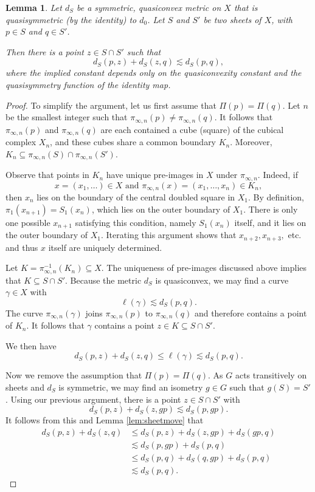 \documentclass{amsart}
\theoremstyle{plain}
\newtheorem{lemma}[theorem]{Lemma}
\theoremstyle{definition}
\numberwithin{equation}{section}
\numberwithin{theorem}{section}
\begin{document}
\begin{lemma}\label{lem:twosheets}
Let $d_{S}$ be a symmetric, quasiconvex metric on $X$ that is quasisymmetric (by the identity) to $d_0$. Let $S$ and $S'$ be two sheets of $X$, with $p\in S$ and $q\in S'$.

Then there is a point $z\in S\cap S'$ such that
$$ d_{S}(p,z) + d_{S}(z,q) \lesssim d_{S}(p,q),$$
where the implied constant depends only on the quasiconvexity constant and the quasisymmetry function of the identity map.
\end{lemma}
\begin{proof}
To simplify the argument, let us first assume that $\Pi(p) = \Pi(q)$. Let $n$ be the smallest integer such that $\pi_{\infty,n}(p)\neq \pi_{\infty,n}(q)$. It follows that $\pi_{\infty,n}(p)$ and $\pi_{\infty,n}(q)$ are each contained a cube (square) of the cubical complex $X_n$, and these cubes share a common boundary $K_n$. Moreover, $K_n\subseteq \pi_{\infty,n}(S) \cap \pi_{\infty,n}(S')$.

Observe that points in $K_n$ have unique pre-images in $X$ under $\pi_{\infty,n}$. Indeed, if
$$x=(x_1,\dots)\in X \text{ and } \pi_{\infty,n}(x)= (x_1, \dots, x_n) \in K_n,$$
then $x_n$ lies on the boundary of the central doubled square in $X_1$. By definition, $\pi_1(x_{n+1})=S_1(x_n)$, which lies on the outer boundary of $X_1$. There is only one possible $x_{n+1}$ satisfying this condition, namely $S_1(x_n)$ itself, and it lies on the outer boundary of $X_1$. Iterating this argument shows that $x_{n+2}, x_{n+3}, $ etc. and thus $x$ itself are uniquely determined.

Let $K=\pi_{\infty,n}^{-1}(K_n)\subseteq X$. The uniqueness of pre-images discussed above implies that $K\subseteq S\cap S'$. Because the metric $d_S$ is quasiconvex, we may find a curve $\gamma\in X$ with
$$ \ell(\gamma) \lesssim d_S(p,q).$$
The curve $\pi_{\infty,n}(\gamma)$ joins $\pi_{\infty,n}(p)$ to $\pi_{\infty,n}(q)$ and therefore contains a point of $K_n$. It follows that $\gamma$ contains a point $z\in K\subseteq S\cap S'$.

We then have
$$ d_S(p,z) + d_S(z,q) \leq \ell(\gamma) \lesssim d_S(p,q).$$

Now we remove the assumption that $\Pi(p)=\Pi(q)$. As $G$ acts transitively on sheets and $d_S$ is symmetric, we may find an isometry $g\in G$ such that $g(S)=S'$. Using our previous argument, there is a point $z\in S\cap S'$ with
$$ d_S(p,z) + d_S(z,gp) \lesssim d_S(p,gp).$$
It follows from this and Lemma \ref{lem:sheetmove} that
\begin{align*}
d_S(p,z)+d_S(z,q) &\leq d_S(p,z)+d_S(z,gp)+d_S(gp,q)\\ 
&\lesssim d_S(p,gp) + d_S(p,q)\\
&\leq d_S(p,q)+d_S(q,gp) + d_S(p,q)\\
&\lesssim d_S(p,q).
\end{align*}
\end{proof}
\end{document}
